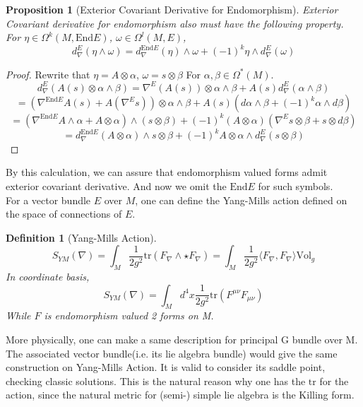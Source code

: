 \documentclass{article}
\newtheorem{defn}{Definition}
\newtheorem{prop}{Proposition}
\begin{document}
\begin{prop}[Exterior Covariant Derivative for Endomorphism]
    Exterior Covariant derivative for endomorphism also must have the following property.
    For $\eta\in\Omega^k(M,\mathrm{End}E)$, $\omega \in \Omega^l(M,E)$,
    \[
        d_\nabla^E(\eta\wedge\omega) = d_\nabla^{\mathrm{End}E}(\eta) \wedge \omega+ (-1)^k \eta\wedge d_\nabla^E(\omega)
    \]
\end{prop}
\begin{proof}
    Rewrite that $\eta = A\otimes \alpha$, $\omega = s \otimes \beta$ For $\alpha,\beta\in\Omega^*(M)$.
    \[
        d_\nabla^E(A(s)\otimes\alpha\wedge\beta) = \nabla^E(A(s))\otimes\alpha\wedge\beta + A(s)d_\nabla^E(\alpha\wedge\beta)
    \]
    \[
        =(\nabla^{\mathrm{End}E}A(s)+A(\nabla^Es))\otimes \alpha \wedge \beta + A(s)(d\alpha\wedge\beta +(-1)^k\alpha\wedge d\beta)
    \]
    \[
        =(\nabla^{\mathrm{End}E}A\wedge\alpha+A\otimes\alpha)\wedge(s\otimes\beta) + (-1)^k(A\otimes\alpha)(\nabla^Es\otimes\beta + s\otimes d\beta)
    \]
    \[
        = d_\nabla^{\mathrm{End}E}(A\otimes\alpha) \wedge s\otimes\beta+ (-1)^k A\otimes \alpha\wedge d_\nabla^E(s\otimes\beta)
    \]
\end{proof}
By this calculation, we can assure that endomorphism valued forms admit exterior covariant derivative. And now we omit the $\mathrm{End}E$ for such symbols. \\
For a vector bundle $E$ over $M$, one can define the Yang-Mills action defined on the space of connections of $E$.

\begin{defn}[Yang-Mills Action] 
\[
    S_{YM}(\nabla) = \int_M \frac{1}{2g^2} \mathrm{tr}(F_\nabla\wedge\star F_\nabla) = \int_M \frac{1}{2g^2} \langle F_\nabla, F_\nabla \rangle \mathrm{Vol}_g
\]
In coordinate basis, 
\[
    S_{YM}(\nabla) = \int_M d^4 x \frac{1}{2g^2} \mathrm{tr}(F^{\mu\nu}F_{\mu \nu})
\] 
While $F$ is endomorphism valued 2 forms on M. 
\end{defn}
More physically, one can make a same description for principal G bundle over M. The associated vector bundle(i.e. its lie algebra bundle) would give the same construction on Yang-Mills Action. It is valid to consider its saddle point, checking classic solutions. This is the natural reason why one has the $\mathrm{tr}$ for the action, since the natural metric for (semi-) simple lie algebra is the Killing form. 
\end{document}
